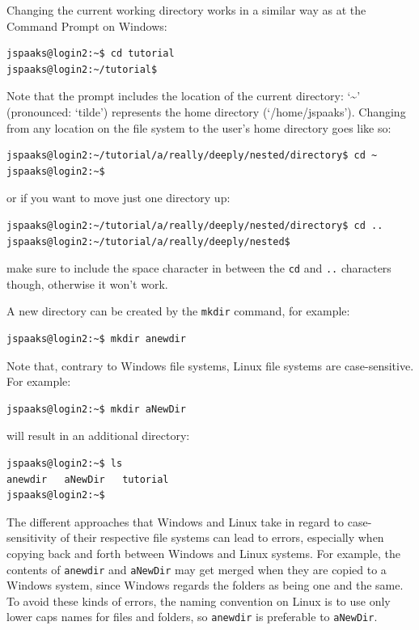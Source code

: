 Changing the current working directory works in a similar way as at the Command Prompt on Windows:
\begin{lstlisting}[style=basic,style=bash]
jspaaks@login2:~$ cd tutorial
jspaaks@login2:~/tutorial$
\end{lstlisting}
Note that the prompt includes the location of the current directory: `\textasciitilde' (pronounced: `tilde') represents the home directory (`/home/jspaaks').
Changing from any location on the file system to the user's home directory goes like so:
\begin{lstlisting}[style=basic,style=bash]
jspaaks@login2:~/tutorial/a/really/deeply/nested/directory$ cd ~
jspaaks@login2:~$
\end{lstlisting}
or if you want to move just one directory up:
\begin{lstlisting}[style=basic,style=bash]
jspaaks@login2:~/tutorial/a/really/deeply/nested/directory$ cd ..
jspaaks@login2:~/tutorial/a/really/deeply/nested$
\end{lstlisting}
make sure to include the space character in between the \texttt{cd} and \texttt{..} characters though, otherwise it won't work.

A new directory can be created by the \texttt{mkdir} command, for example:
\begin{lstlisting}[style=basic,style=bash]
jspaaks@login2:~$ mkdir anewdir
\end{lstlisting}
Note that, contrary to Windows file systems, Linux file systems are case-sensitive. For example:
\begin{lstlisting}[style=basic,style=bash]
jspaaks@login2:~$ mkdir aNewDir
\end{lstlisting}
will result in an additional directory:
\begin{lstlisting}[style=basic,style=bash]
jspaaks@login2:~$ ls
anewdir   aNewDir   tutorial
jspaaks@login2:~$
\end{lstlisting}
The different approaches that Windows and Linux take in regard to case-sensitivity of their respective file systems can lead to errors, especially when copying back and forth between Windows and Linux systems. For example, the contents of \lstinline{anewdir} and \lstinline{aNewDir} may get merged when they are copied to a Windows system, since Windows regards the folders as being one and the same. To avoid these kinds of errors, the naming convention on Linux is to use only lower caps names for files and folders, so \lstinline{anewdir} is preferable to  \lstinline{aNewDir}.

